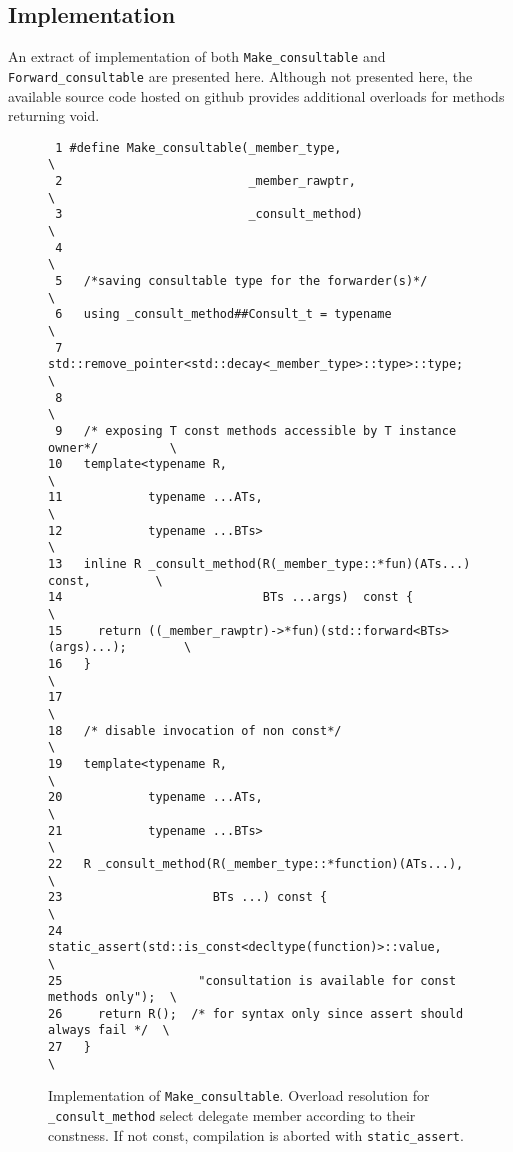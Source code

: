\documentclass{article}
\begin{document}
\subsection{Implementation}
\label{implementation}

An extract of implementation of both \verb+Make_consultable+ and \verb+Forward_consultable+ are presented here. Although not presented here, the available source code hosted on github provides additional overloads for methods returning void. 

\begin{figure}[ht]
{\small
\begin{lstlisting}
 1 #define Make_consultable(_member_type,                                  \
 2                          _member_rawptr,                                \
 3                          _consult_method)                               \
 4                                                                         \
 5   /*saving consultable type for the forwarder(s)*/                      \
 6   using _consult_method##Consult_t = typename                           \
 7       std::remove_pointer<std::decay<_member_type>::type>::type;        \
 8                                                                         \
 9   /* exposing T const methods accessible by T instance owner*/          \
10   template<typename R,                                                  \
11            typename ...ATs,                                             \
12            typename ...BTs>                                             \
13   inline R _consult_method(R(_member_type::*fun)(ATs...) const,         \
14                            BTs ...args)	const {                        \
15     return ((_member_rawptr)->*fun)(std::forward<BTs>(args)...);        \
16   }                                                                     \
17                                                                         \
18   /* disable invocation of non const*/                                  \
19   template<typename R,                                                  \
20            typename ...ATs,                                             \
21            typename ...BTs>                                             \
22   R _consult_method(R(_member_type::*function)(ATs...),                 \
23                     BTs ...) const {                                   \
24     static_assert(std::is_const<decltype(function)>::value,             \
25                   "consultation is available for const methods only");  \
26     return R();  /* for syntax only since assert should always fail */  \
27   }                                                                     \
\end{lstlisting}}
\cprotect\caption{Implementation of \verb+Make_consultable+. Overload resolution for \verb+_consult_method+ select delegate member according to their constness. If not const, compilation is aborted with \verb+static_assert+.}
\label{impl:make}
\end{figure}
\end{document}
